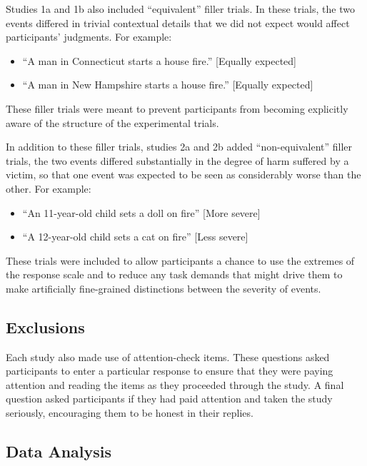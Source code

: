 \documentclass[10pt, letterpaper]{article}
\begin{document}
Studies 1a and 1b also included ``equivalent'' filler trials. In these
trials, the two events differed in trivial contextual details that we
did not expect would affect participants' judgments. For example:

\begin{itemize}
\item
  ``A man in Connecticut starts a house fire.'' {[}Equally expected{]}
\item
  ``A man in New Hampshire starts a house fire.'' {[}Equally expected{]}
\end{itemize}

These filler trials were meant to prevent participants from becoming
explicitly aware of the structure of the experimental trials.

In addition to these filler trials, studies 2a and 2b added
``non-equivalent'' filler trials, the two events differed substantially
in the degree of harm suffered by a victim, so that one event was
expected to be seen as considerably worse than the other. For example:

\begin{itemize}
\item
  ``An 11-year-old child sets a doll on fire'' {[}More severe{]}
\item
  ``A 12-year-old child sets a cat on fire'' {[}Less severe{]}
\end{itemize}

These trials were included to allow participants a chance to use the
extremes of the response scale and to reduce any task demands that might
drive them to make artificially fine-grained distinctions between the
severity of events.

\subsection{Exclusions}\label{exclusions}

Each study also made use of attention-check items. These questions asked
participants to enter a particular response to ensure that they were
paying attention and reading the items as they proceeded through the
study. A final question asked participants if they had paid attention
and taken the study seriously, encouraging them to be honest in their
replies.

\subsection{Data Analysis}\label{data-analysis}
\end{document}
